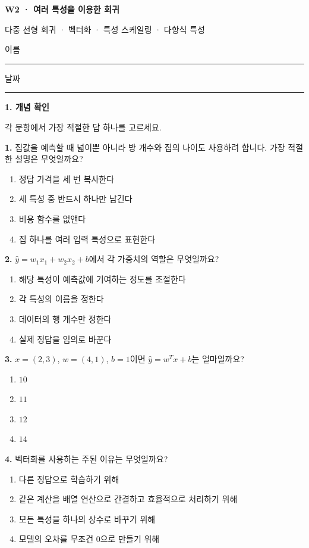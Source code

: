 \documentclass[11pt,a4paper]{article}
\newcommand{\parttitle}[2]{{\large\bfseries\color{ink} #1}\par{\small #2}\par\vspace{5mm}}
\newcommand{\question}[2]{\textbf{#1.} #2\par}
\begin{document}
{\LARGE\bfseries\color{ink} W2 · 여러 특성을 이용한 회귀}\par
{\small 다중 선형 회귀 · 벡터화 · 특성 스케일링 · 다항식 특성}\par
\vspace{3mm}이름\enspace\rule{43mm}{0.3pt}\hfill 날짜\enspace\rule{35mm}{0.3pt}\par\vspace{3mm}
\parttitle{1. 개념 확인}{각 문항에서 가장 적절한 답 하나를 고르세요.}
\question{1}{집값을 예측할 때 넓이뿐 아니라 방 개수와 집의 나이도 사용하려 합니다. 가장 적절한 설명은 무엇일까요?}
\begin{enumerate}[label=(\arabic*),leftmargin=9mm,itemsep=0pt,topsep=2pt,parsep=0pt]
\item 정답 가격을 세 번 복사한다
\item 세 특성 중 반드시 하나만 남긴다
\item 비용 함수를 없앤다
\item 집 하나를 여러 입력 특성으로 표현한다
\end{enumerate}\vfill
\question{2}{$\hat y=w_1x_1+w_2x_2+b$에서 각 가중치의 역할은 무엇일까요?}
\begin{enumerate}[label=(\arabic*),leftmargin=9mm,itemsep=0pt,topsep=2pt,parsep=0pt]
\item 해당 특성이 예측값에 기여하는 정도를 조절한다
\item 각 특성의 이름을 정한다
\item 데이터의 행 개수만 정한다
\item 실제 정답을 임의로 바꾼다
\end{enumerate}\vfill
\question{3}{$x=(2,3)$, $w=(4,1)$, $b=1$이면 $\hat y=w^Tx+b$는 얼마일까요?}
\begin{enumerate}[label=(\arabic*),leftmargin=9mm,itemsep=0pt,topsep=2pt,parsep=0pt]
\item $10$
\item $11$
\item $12$
\item $14$
\end{enumerate}\vfill
\question{4}{벡터화를 사용하는 주된 이유는 무엇일까요?}
\begin{enumerate}[label=(\arabic*),leftmargin=9mm,itemsep=0pt,topsep=2pt,parsep=0pt]
\item 다른 정답으로 학습하기 위해
\item 같은 계산을 배열 연산으로 간결하고 효율적으로 처리하기 위해
\item 모든 특성을 하나의 상수로 바꾸기 위해
\item 모델의 오차를 무조건 0으로 만들기 위해
\end{enumerate}\vfill
\end{document}
